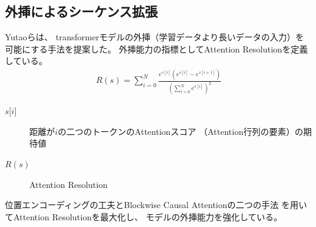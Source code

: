 \documentclass{jsarticle}
\begin{document}
\subsection{外挿によるシーケンス拡張}
    Yutaoら\cite{extra}は、
    transformerモデルの外挿（学習データより長いデータの入力）を可能にする手法を提案した。
    外挿能力の指標としてAttention Resolutionを定義している。
    \begin{align*}
        R(s) = \sum_{i=0}^N\frac{e^{s[i]}\left(e^{s[i]}-e^{s[i+1]}\right)}{\left(\sum_{i=0}^Ne^{s[i]}\right)^2}
    \end{align*}
    \begin{description}
        \item[$s\textrm{[}i\textrm{]}$]{
            距離が$i$の二つのトークンのAttentionスコア
            （Attention行列の要素）の期待値
        }
        \item[$R(s)$] Attention Resolution
    \end{description}

    位置エンコーディングの工夫とBlockwise Causal Attentionの二つの手法
    を用いてAttention Resolutionを最大化し、
    モデルの外挿能力を強化している。
\end{document}
